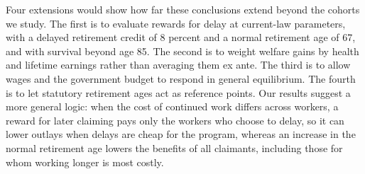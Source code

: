 Four extensions would show how far these conclusions extend beyond the cohorts we study. The first is to evaluate rewards for delay at current-law parameters, with a delayed retirement credit of 8 percent and a normal retirement age of 67, and with survival beyond age 85. The second is to weight welfare gains by health and lifetime earnings rather than averaging them ex ante. The third is to allow wages and the government budget to respond in general equilibrium. The fourth is to let statutory retirement ages act as reference points. Our results suggest a more general logic: when the cost of continued work differs across workers, a reward for later claiming pays only the workers who choose to delay, so it can lower outlays when delays are cheap for the program, whereas an increase in the normal retirement age lowers the benefits of all claimants, including those for whom working longer is most costly.
